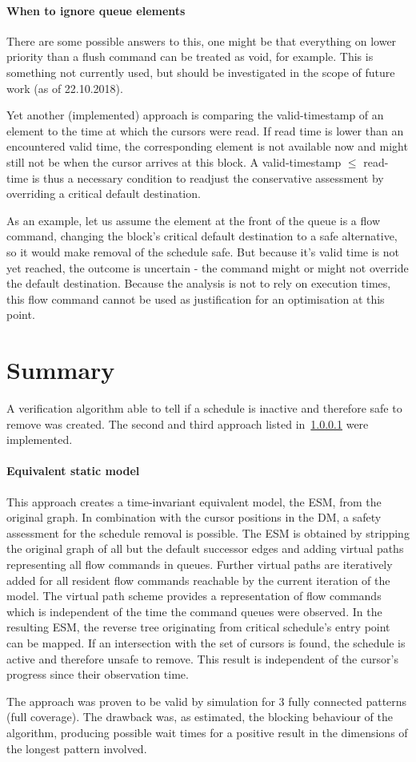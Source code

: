 \paragraph{When to ignore queue elements}
There are some possible answers to this, one might be that everything on lower priority than a flush command can be treated as void, for example. This is something not currently used, but should be investigated in the scope of future work (as of 22.10.2018).
\par
Yet another (implemented) approach is comparing the valid-timestamp of an element to the time at which the cursors were read.
If read time is lower than an encountered valid time, the corresponding element is not available now and might still not be when the cursor arrives at this block.
A valid-timestamp $\le$ read-time is thus a necessary condition to readjust the conservative assessment by overriding a critical default destination.
\par
As an example, let us assume the element at the front of the queue is a flow command, changing the block's critical default destination to a safe alternative, so it would make removal of the schedule safe.
But because it's valid time is not yet reached, the outcome is uncertain - the command might or might not override the default destination. Because the analysis is not to rely on execution times, this flow command cannot be used as justification for an optimisation at this point.


\section{Summary}
A verification algorithm able to tell if a schedule is inactive and therefore safe to remove was created. The second and third approach listed in~\ref{} were implemented.
\paragraph{Equivalent static model} This approach creates a time-invariant equivalent model, the ESM, from the original graph. In combination with the cursor positions in the DM, a safety assessment for the schedule removal is possible. The ESM is obtained by stripping the original graph of all but the default successor edges and adding virtual paths representing all flow commands in queues. Further virtual paths are iteratively added for all resident flow commands reachable by the current iteration of the model. The virtual path scheme provides a representation of flow commands which is independent of the time the command queues were observed.
In the resulting ESM, the reverse tree originating from critical schedule's entry point can be mapped. If an intersection with the set of cursors
is found, the schedule is active and therefore unsafe to remove.
This result is independent of the cursor's progress since their observation time.
\par The approach was proven to be valid by simulation for 3 fully  connected patterns (full coverage). The drawback was, as estimated, the blocking behaviour of the algorithm, producing possible wait times for a positive result in the dimensions of the longest pattern involved.
